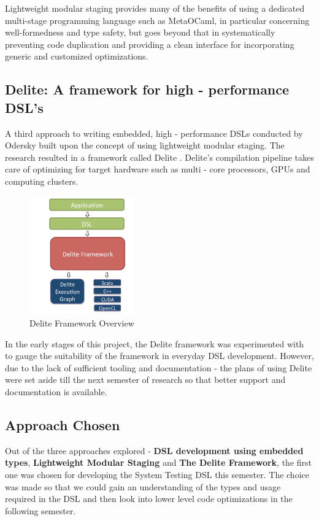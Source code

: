 \documentclass[12 pt]{article}
\begin{document}
\noindent
Lightweight modular staging provides many of the benefits of using a dedicated multi-stage programming language such as MetaOCaml, in particular concerning well-formedness and type safety, but goes beyond that in systematically preventing code duplication and providing a clean interface for incorporating generic and customized optimizations.

\subsection{Delite: A framework for high - performance DSL's}
A third approach to writing embedded, high - performance DSLs conducted by Odersky built upon the concept of using lightweight modular staging. The research resulted in a framework called Delite \cite{delite}. Delite's compilation pipeline takes care of optimizing for target hardware such as multi - core processors, GPUs and computing clusters.

\begin{figure}[h!]
  \centering
    \includegraphics[width=170px]{figures/delite.png}
  \caption{Delite Framework Overview}
\end{figure}

\noindent
In the early stages of this project, the Delite framework was experimented with to gauge the suitability of the framework in everyday DSL development. However, due to the lack of sufficient tooling and documentation - the plans of using Delite were set aside till the next semester of research so that better support and documentation is available.
\bigskip

\subsection{Approach Chosen}
Out of the three approaches explored - \textbf{DSL development using embedded types}, \textbf{Lightweight Modular Staging} and \textbf{The Delite Framework}, the first one was chosen for developing the System Testing DSL this semester. The choice was made so that we could gain an understanding of the types and usage required in the DSL and then look into lower level code optimizations in the following semester.
\newpage
\end{document}
